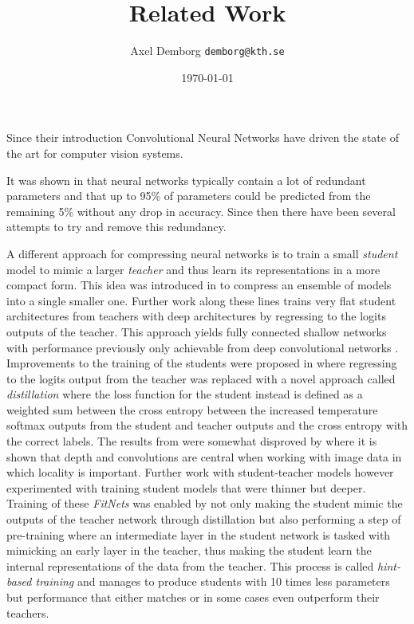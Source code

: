 \documentclass[11pt]{article}
\author{Axel Demborg \texttt{demborg@kth.se}}
\date{\today}
\title{Related Work}
\newcommand{\bibentry}[1]{\cite{#1}}
\begin{document}
\maketitle
Since their introduction Convolutional Neural Networks\bibentry{lecun1998gradient} have driven the state of the art for computer vision systems. 

It was shown in\bibentry{denil2013predicting} that neural networks typically contain a lot of redundant parameters and that up to 95\% of parameters could be predicted from the remaining 5\% without any drop in accuracy. Since then there have been several attempts to try and remove this redundancy. 

A different approach for compressing neural networks is to train a small \emph{student} model to mimic a larger \emph{teacher} and thus learn its representations in a more compact form. This idea was introduced in\bibentry{bucilua2006model} to compress an ensemble of models into a single smaller one. Further work along these lines trains very flat student architectures from teachers with deep architectures by regressing to the logits outputs of the teacher. This approach yields fully connected shallow networks with performance previously only achievable from deep convolutional networks \bibentry{ba2014deep}. Improvements to the training of the students were proposed in\bibentry{hinton2015distilling} where regressing to the logits output from the teacher was replaced with a novel approach called \emph{distillation} where the loss function for the student instead is defined as a weighted sum between the cross entropy between the increased temperature softmax outputs from the student and teacher outputs and the cross entropy with the correct labels. 
The results from\bibentry{ba2014deep} were somewhat disproved by \bibentry{urban2016deep} where it is shown that depth and convolutions are central when working with image data in which locality is important. Further work with student-teacher models however experimented with training student models that were thinner but deeper. Training of these \emph{FitNets} was enabled by not only making the student mimic the outputs of the teacher network through distillation but also performing a step of pre-training where an intermediate layer in the student network is tasked with mimicking an early layer in the teacher, thus making the student learn the internal representations of the data from the teacher\bibentry{romero2014fitnets}. This process is called \emph{hint-based training} and manages to produce students with 10 times less parameters but performance that either matches or in some cases even outperform their teachers.

 

\end{document}

